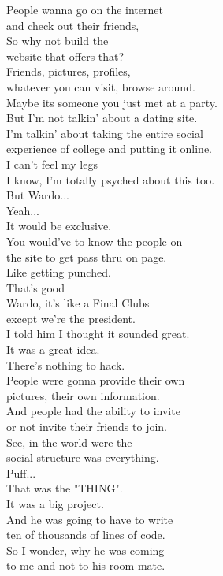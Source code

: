\documentclass{article}
\begin{document}
\begin{multicols}{3}
People wanna go on the internet\\
and check out their friends,\\
So why not build the\\
website that offers that?\\
Friends, pictures, profiles,\\
whatever you can visit, browse around.\\
Maybe its someone you just met at a party.\\
But I'm not talkin' about a dating site.\\
I'm talkin' about taking the entire social\\
experience of college and putting it online.\\
I can't feel my legs\\
I know, I'm totally psyched about this too.\\
But Wardo...\\
Yeah...\\
It would be exclusive.\\
You would've to know the people on\\
the site to get pass thru on page.\\
Like getting punched.\\
That's good\\
Wardo, it's like a Final Clubs\\
except we're the president.\\
I told him I thought it sounded great.\\
It was a great idea.\\
There's nothing to hack.\\
People were gonna provide their own\\
pictures, their own information.\\
And people had the ability to invite\\
or not invite their friends to join.\\
See, in the world were the\\
social structure was everything.\\
Puff...\\
That was the "THING".\\
It was a big project.\\
And he was going to have to write\\
ten of thousands of lines of code.\\
So I wonder, why he was coming\\
to me and not to his room mate.\\

\end{multicols}
\end{document}
